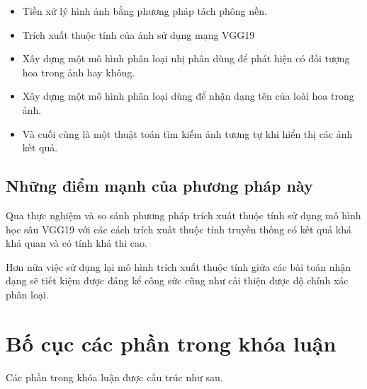 \documentclass[12pt]{report}
\begin{document}
		\begin{itemize}
			\item Tiền xử lý hình ảnh bằng phương pháp tách phông nền.
			\item Trích xuất thuộc tính của ảnh sử dụng mạng VGG19 \cite{cia_vgg19}
			\item Xây dựng một mô hình phân loại nhị phân dùng để phát hiện có đối tượng hoa trong ảnh hay không.
			\item Xây dựng một mô hình phân loại dùng để nhận dạng tên của loài hoa trong ảnh.
			\item Và cuối cùng là một thuật toán tìm kiếm ảnh tương tự khi hiển thị các ảnh kết quả.
		\end{itemize}
																																																												
																																																												
		\subsection{Những điểm mạnh của phương pháp này}
		Qua thực nghiệm và so sánh phương pháp trích xuất thuộc tính sử dụng mô hình học sâu VGG19 \cite{cia_vgg19} với các cách trích xuất thuộc tính truyền thống có kết quả khá khả quan và có tính khả thi cao.
																																																								
		Hơn nữa việc sử dụng lại mô hình trích xuất thuộc tính giữa các bài toán nhận dạng sẽ tiết kiệm được đáng kể công sức cũng như cải thiện được độ chính xác phân loại.
																																																								
		\section{Bố cục các phần trong khóa luận}
		Các phần trong khóa luận được cấu trúc như sau.
																																																								
\end{document}

